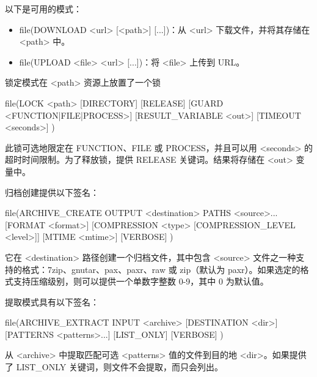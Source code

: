 
以下是可用的模式：

\begin{itemize}
\item
file(DOWNLOAD <url> [<path>] [...])：从 <url> 下载文件，并将其存储在 <path> 中。

\item
file(UPLOAD <file> <url> [...])：将 <file> 上传到 URL。
\end{itemize}


锁定模式在 <path> 资源上放置了一个锁

\begin{shell}
file(LOCK <path> [DIRECTORY] [RELEASE]
    [GUARD <FUNCTION|FILE|PROCESS>]
    [RESULT_VARIABLE <out>] [TIMEOUT <seconds>]
)
\end{shell}

此锁可选地限定在 FUNCTION、FILE 或 PROCESS，并且可以用 <seconds> 的超时时间限制。为了释放锁，提供 RELEASE 关键词。结果将存储在 <out> 变量中。


归档创建提供以下签名：

\begin{shell}
file(ARCHIVE_CREATE OUTPUT <destination> PATHS <source>...
    [FORMAT <format>]
    [COMPRESSION <type> [COMPRESSION_LEVEL <level>]]
    [MTIME <mtime>] [VERBOSE]
)
\end{shell}

它在 <destination> 路径创建一个归档文件，其中包含 <source> 文件之一种支持的格式：7zip、gnutar、pax、paxr、raw 或 zip（默认为 paxr）。如果选定的格式支持压缩级别，则可以提供一个单数字整数 0-9，其中 0 为默认值。

提取模式具有以下签名：

\begin{shell}
file(ARCHIVE_EXTRACT INPUT <archive> [DESTINATION <dir>]
    [PATTERNS <patterns>...] [LIST_ONLY] [VERBOSE]
)
\end{shell}

从 <archive> 中提取匹配可选 <patterns> 值的文件到目的地 <dir>。如果提供了 LIST\_ONLY 关键词，则文件不会提取，而只会列出。



